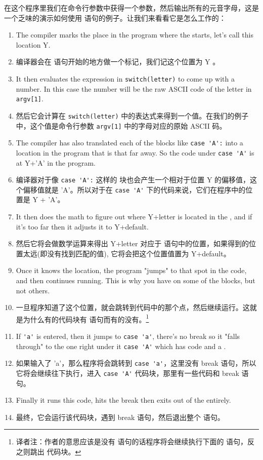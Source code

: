 在这个程序里我们在命令行参数中获得一个参数，然后输出所有的元音字母，这是一个乏味的演示如何使用  语句的例子。让我们来看看它是怎么工作的：
\begin{enumerate}
\item The compiler marks the place in the program where the
     starts, let's call this location Y.
\item 编译器会在  语句开始的地方做一个标记，我们记这个位置为 Y 。
\item It then evaluates the expression in \verb|switch(letter)| to
    come up with a number.  In this case the number will be the
    raw ASCII code of the letter in \verb|argv[1]|.
\item 然后它会计算在 \verb|switch(letter)| 中的表达式来得到一个值。在我们的例子中，这个值是命令行参数 \verb|argv[1]| 中的字母对应的原始 ASCII 码。
\item The compiler has also translated each of the  
    blocks like \verb|case 'A':| into a location in the program
    that is that far away.  So the code under \verb|case 'A'| is
    at Y+'A' in the program.
\item 编译器对于像 \verb|case 'A':| 这样的  块也会产生一个相对于位置 Y 的偏移值，这个偏移值就是 'A'。所以对于在 \verb|case 'A'| 下的代码来说，它们在程序中的位置是 Y + 'A'。
\item It then does the math to figure out where Y+letter is
    located in the , and if it's too
    far then it adjusts it to Y+default.
\item 然后它将会做数学运算来得出 Y+letter 对应于  语句中的位置，如果得到的位置太远(即没有找到匹配的值), 它将会把这个位置值置为 Y+default。
\item Once it knows the location, the program "jumps" to that spot
    in the code, and then continues running.  This is why you have
     on some of the  blocks, but not others.
\item 一旦程序知道了这个位置，就会跳转到代码中的那个点，然后继续运行。这就是为什么有的代码块有  语句而有的没有。\footnote{译者注：作者的意思应该是没有  语句的话程序将会继续执行下面的  语句，反之则跳出  代码块。}
\item If \verb|'a'| is entered, then it jumps to \verb|case 'a'|, there's
    no break so it "falls through" to the one right under it \verb|case 'A'|
    which has code and a .
\item 如果输入了 'a'，那么程序将会跳转到 \verb|case 'a'|，这里没有 break 语句，所以它将会继续往下执行，进入 \verb|case 'A'| 代码块，那里有一些代码和 break 语句。
\item Finally it runs this code, hits the break then exits out of the
     entirely.
\item 最终，它会运行该代码块，遇到 break 语句，然后退出整个  语句。
\end{enumerate}

